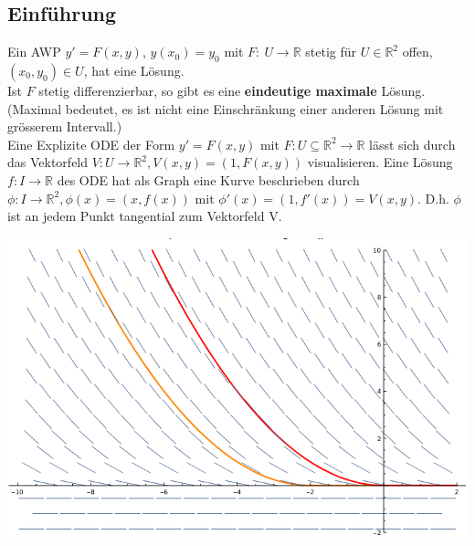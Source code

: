 \subsection{Einführung}
  Ein AWP $y'=F(x,y)$, $y(x_0)=y_0$ mit $F:\ U\rightarrow\mathbb R$ stetig für
  $U\in\mathbb R^2$ offen, $(x_0,y_0)\in U$, hat eine Lösung.\\
  Ist $F$ stetig differenzierbar, so gibt es eine \textbf{eindeutige maximale}
  Lösung. (Maximal bedeutet, es ist nicht eine Einschränkung einer anderen Lösung
  mit grösserem Intervall.)\\
  Eine Explizite ODE der Form $y'=F(x,y)$ mit $F: U\subseteq\mathbb 
  R^2\rightarrow\mathbb R$ lässt sich durch das Vektorfeld $V: 
  U\rightarrow\mathbb R^2, V(x,y) = (1, F(x,y))$ visualisieren. Eine Lösung $f: 
  I\rightarrow\mathbb R$ des ODE hat als Graph eine Kurve beschrieben durch
  $\phi:I\rightarrow\mathbb R^2, \phi(x)=(x,f(x))$ mit $\phi'(x)=(1,
  f'(x))=V(x,y)$. D.h. $\phi$ ist an jedem Punkt tangential zum Vektorfeld V.\\
  \begin{minipage}{\linewidth}
    \includegraphics[width=\linewidth]{./sources/beispiel_vektorfelddarstellung.png}
  \end{minipage}
